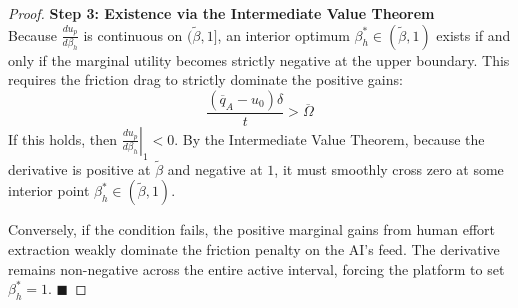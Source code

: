 \documentclass[mnsc,nonblindrev]{informs3_NoOR}
\begin{document}
\begin{proof}
\vspace{0.3cm}
\noindent \textbf{Step 3: Existence via the Intermediate Value Theorem} \\
Because $\frac{du_p}{d\beta_h}$ is continuous on $(\tilde{\beta}, 1]$, an interior optimum $\beta_h^* \in (\tilde{\beta}, 1)$ exists if and only if the marginal utility becomes strictly negative at the upper boundary. This requires the friction drag to strictly dominate the positive gains:
\begin{equation}
    \frac{(\overline{q}_A - u_0)\delta}{t} > \overline{\Omega}
\end{equation}
If this holds, then $\left. \frac{du_p}{d\beta_h} \right|_{1} < 0$. By the Intermediate Value Theorem, because the derivative is positive at $\tilde{\beta}$ and negative at $1$, it must smoothly cross zero at some interior point $\beta_h^* \in (\tilde{\beta}, 1)$.

Conversely, if the condition fails, the positive marginal gains from human effort extraction weakly dominate the friction penalty on the AI's feed. The derivative remains non-negative across the entire active interval, forcing the platform to set $\beta_h^* = 1$. \hfill $\blacksquare$
\end{proof}
\end{document}
